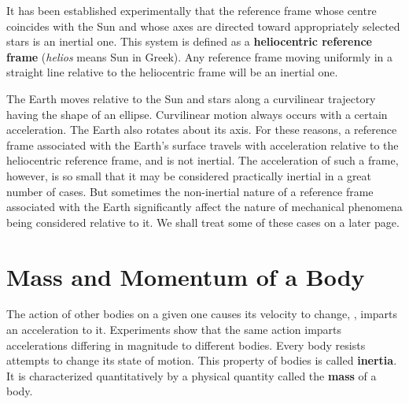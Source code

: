 It has been established experimentally that the reference frame whose centre coincides with the Sun and whose axes are directed toward appropriately selected stars is an inertial one. This system is defined as a \textbf{heliocentric reference frame} (\textit{helios} means Sun in Greek). Any reference frame moving uniformly in a straight line relative to the heliocentric frame will be an inertial one.

The Earth moves relative to the Sun and stars along a curvilinear trajectory having the shape of an ellipse. Curvilinear motion always occurs with a certain acceleration. The Earth also rotates about its axis. For these reasons, a reference frame associated with the Earth's surface travels with acceleration relative to the heliocentric reference frame, and is not inertial. The acceleration of such a frame, however, is so small that it may be considered practically inertial in a great number of cases. But sometimes the non-inertial nature of a reference frame associated with the Earth significantly affect the nature of mechanical phenomena being considered relative to it. We shall treat some of these cases on a later page.

\section{Mass and Momentum of a Body}\label{sec:2_3}

The action of other bodies on a given one causes its velocity to change, \ie, imparts an acceleration to it. Experiments show that the same action imparts accelerations differing in magnitude to different bodies. Every body resists attempts to change its state of motion. This property of bodies is called \textbf{inertia}. It is characterized quantitatively by a physical quantity called the \textbf{mass} of a body.

